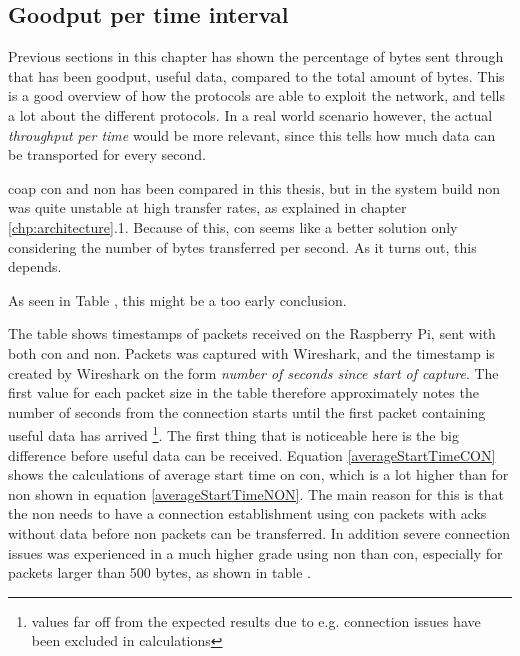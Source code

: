 
\subsection{Goodput per time interval}

Previous sections in this chapter has shown the percentage of bytes sent through that has been goodput, useful data, compared to the total amount of bytes. This is a good overview of how the protocols are able to exploit the network, and tells a lot about the different protocols. In a real world scenario however, the actual \textit{throughput per time} would be more relevant, since this tells how much data can be transported for every second.

\gls{coap} \gls{con} and \gls{non} has been compared in this thesis, but in the system build \gls{non} was quite unstable at high transfer rates, as explained in chapter \ref{chp:architecture}.1. Because of this, \gls{con} seems like a better solution only considering the number of bytes transferred per second. As it turns out, this depends. 

As seen in Table , this might be a too early conclusion.

The table shows timestamps of packets received on the Raspberry Pi, sent with both \gls{con} and \gls{non}. Packets was captured with Wireshark, and the timestamp is created by Wireshark on the form \textit{number of seconds since start of capture}. The first value for each packet size in the table therefore approximately notes the number of seconds from the connection starts until the first packet containing useful data has arrived \footnote{values far off from the expected results due to e.g. connection issues have been excluded in calculations }. The first thing that is noticeable here is the big difference before useful data can be received. Equation \ref{averageStartTimeCON} shows the calculations of average start time on \gls{con}, which is a lot higher than for \gls{non} shown in equation \ref{averageStartTimeNON}. The main reason for this is that the \gls{non} needs to have a connection establishment using \gls{con} packets with \glspl{ack} without data before \gls{non} packets can be transferred. In addition severe connection issues was experienced in a much higher grade using \gls{non} than \gls{con}, especially for packets larger than 500 bytes, as shown in table .  


